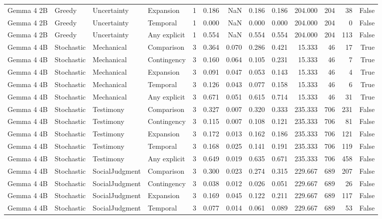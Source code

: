 \begin{tabular}{llllrrrrrrrrr}
Gemma 4 2B & Greedy & Uncertainty & Expansion & 1 & 0.186 & NaN & 0.186 & 0.186 & 204.000 & 204 & 38 & False \\
Gemma 4 2B & Greedy & Uncertainty & Temporal & 1 & 0.000 & NaN & 0.000 & 0.000 & 204.000 & 204 & 0 & False \\
Gemma 4 2B & Greedy & Uncertainty & Any explicit & 1 & 0.554 & NaN & 0.554 & 0.554 & 204.000 & 204 & 113 & False \\
Gemma 4 4B & Stochastic & Mechanical & Comparison & 3 & 0.364 & 0.070 & 0.286 & 0.421 & 15.333 & 46 & 17 & True \\
Gemma 4 4B & Stochastic & Mechanical & Contingency & 3 & 0.160 & 0.064 & 0.105 & 0.231 & 15.333 & 46 & 7 & True \\
Gemma 4 4B & Stochastic & Mechanical & Expansion & 3 & 0.091 & 0.047 & 0.053 & 0.143 & 15.333 & 46 & 4 & True \\
Gemma 4 4B & Stochastic & Mechanical & Temporal & 3 & 0.126 & 0.043 & 0.077 & 0.158 & 15.333 & 46 & 6 & True \\
Gemma 4 4B & Stochastic & Mechanical & Any explicit & 3 & 0.671 & 0.051 & 0.615 & 0.714 & 15.333 & 46 & 31 & True \\
Gemma 4 4B & Stochastic & Testimony & Comparison & 3 & 0.327 & 0.007 & 0.320 & 0.333 & 235.333 & 706 & 231 & False \\
Gemma 4 4B & Stochastic & Testimony & Contingency & 3 & 0.115 & 0.007 & 0.108 & 0.121 & 235.333 & 706 & 81 & False \\
Gemma 4 4B & Stochastic & Testimony & Expansion & 3 & 0.172 & 0.013 & 0.162 & 0.186 & 235.333 & 706 & 121 & False \\
Gemma 4 4B & Stochastic & Testimony & Temporal & 3 & 0.168 & 0.025 & 0.141 & 0.191 & 235.333 & 706 & 119 & False \\
Gemma 4 4B & Stochastic & Testimony & Any explicit & 3 & 0.649 & 0.019 & 0.635 & 0.671 & 235.333 & 706 & 458 & False \\
Gemma 4 4B & Stochastic & SocialJudgment & Comparison & 3 & 0.300 & 0.023 & 0.274 & 0.315 & 229.667 & 689 & 207 & False \\
Gemma 4 4B & Stochastic & SocialJudgment & Contingency & 3 & 0.038 & 0.012 & 0.026 & 0.051 & 229.667 & 689 & 26 & False \\
Gemma 4 4B & Stochastic & SocialJudgment & Expansion & 3 & 0.169 & 0.045 & 0.122 & 0.211 & 229.667 & 689 & 117 & False \\
Gemma 4 4B & Stochastic & SocialJudgment & Temporal & 3 & 0.077 & 0.014 & 0.061 & 0.089 & 229.667 & 689 & 53 & False \\

\end{tabular}
